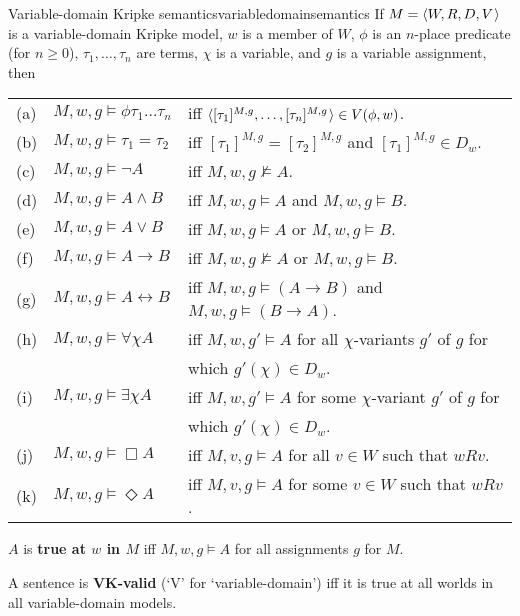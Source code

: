 \begin{definition}{Variable-domain Kripke semantics}{variabledomainsemantics}
  If $\Mfr = \t{W,R,D,V}$ is a variable-domain Kripke model, $w$ is a member of
  $W$, $\phi$ is an $n$-place predicate (for $n\geq 0$), $\tau_1,\ldots,\tau_n$
  are terms, $\chi$ is a variable, and $g$ is a variable assignment, then
  
  
  \medskip\hspace{-4mm}
  \begin{tabular}{lll}
    (a) & $M,w,g \models \phi \tau_1\ldots \tau_n$ &iff $\t{[\tau_1]^{M,g},\ldots,[\tau_n]^{M,g}} \in V(\phi,w)$.\\
    (b) & $M,w,g \models \tau_1=\tau_2$ &iff $[\tau_1]^{M,g} = [\tau_2]^{M,g}$ and $[\tau_1]^{M,g} \in D_w$.\\
    (c) & $M,w,g \models \neg A$ &iff $M,w,g \not\models A$.\\
    (d) & $M,w,g \models A \land B$ &iff $M,w,g \models A$ and $M,w,g \models B$.\\
    (e) & $M,w,g \models A \lor B$ &iff $M,w,g \models A$ or $M,w,g \models B$.\\
    (f) & $M,w,g \models A \to B$ &iff $M,w,g \not\models A$ or $M,w,g \models B$.\\
    (g) & $M,w,g \models A \leftrightarrow B$ &iff $M,w,g \models (A\to B)$ and $M,w,g \models (B\to A)$.\\
    (h) & $M,w,g \models \forall \chi A$ &iff $M,w,g' \models A$ for all $\chi$-variants $g'$ of $g$ for\\[-1mm]
        && which $g'(\chi)\in D_w$.\\
    (i) & $M,w,g \models \exists \chi A$ &iff $M,w,g' \models A$ for some $\chi$-variant $g'$ of $g$ for\\[-1mm]
        && which $g'(\chi)\in D_w$.\\
    (j) & $M,w,g \models \Box A$ &iff $M,v,g \models A$ for all $v\in W$ such that $wRv$.\\
    (k) & $M,w,g \models \Diamond A$ &iff $M,v,g \models A$ for some $v\in W$ such that $wRv$.
  \end{tabular}
  $A$ is \textbf{true at $w$ in $M$} iff $M,w,g \models A$ for all assignments
  $g$ for $M$.
\end{definition}

A sentence is \textbf{VK-valid} (`V' for `variable-domain') iff it is true at all
worlds in all variable-domain models.

